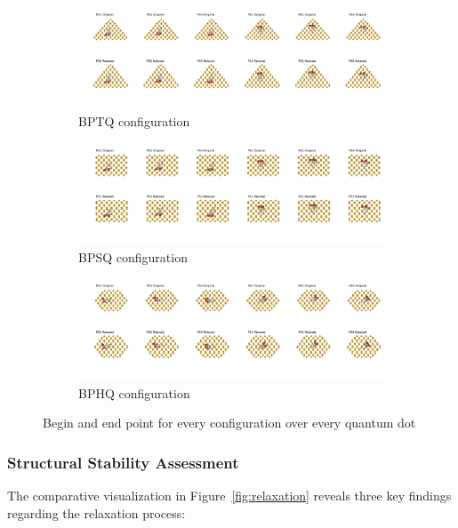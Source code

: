 \documentclass[preprint,12pt]{elsarticle}
\begin{document}
	\begin{figure}[H]
		\centering
		\begin{subfigure}
			\centering
			\includegraphics[width=\textwidth]{BPTQArrayplot.png}
			\caption{BPTQ configuration}
			\label{f:BPTQ}
		\end{subfigure}
		
		\begin{subfigure}
			\centering
			\includegraphics[width=\textwidth]{BPSQArrayplot.png}
			\caption{BPSQ configuration}
			\label{f:BPSQ}
		\end{subfigure}
		
		\begin{subfigure}
			\centering
			\includegraphics[width=\textwidth]{BPHQArrayplot.png}
			\caption{BPHQ configuration}
			\label{f:BPHQ}
		\end{subfigure} 
		\caption{Begin and end point for every configuration over every quantum dot}
		\label{f:Dos_Multiple}
	\end{figure}
	
	\subsubsection{Structural Stability Assessment}
	The comparative visualization in Figure~\ref{fig:relaxation} reveals three key findings regarding the relaxation process:
	
\end{document}
